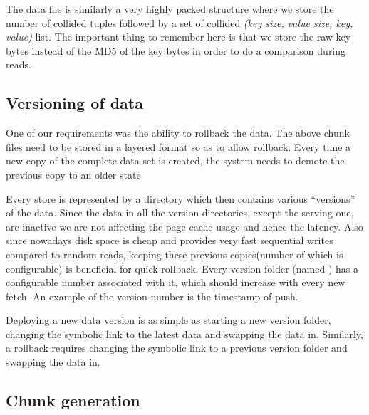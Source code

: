 The data file is similarly a very highly packed structure where we
store the number of collided tuples followed by a set of collided
\emph{(key size, value size, key, value)} list. The important thing to
remember here is that we store the raw key bytes instead of the MD5 of the
key bytes in order to do a comparison during reads. 


\subsection{Versioning of data}
\label{sec:read_only:versioning}

One of our requirements was the ability to rollback the data. The
above chunk files need to be stored in a layered format so as to allow
rollback. Every time a new copy of the complete data-set is created,
the system needs to demote the previous copy to an older state.

Every store is represented by a directory which then contains various
``versions'' of the data. Since the data in all the version
directories, except the serving one, are inactive we are not affecting
the page cache usage and hence the latency. Also since nowadays disk
space is cheap and provides very fast sequential writes compared to
random reads, keeping these previous copies(number of which is
configurable) is beneficial for quick rollback. Every version folder
(named ) has a configurable number associated
with it, which should increase with every new fetch. An example of the
version number is the timestamp of push. 

Deploying a new data version is as simple as starting a new version
folder, changing the symbolic link to the latest data and swapping the
data in. Similarly, a rollback requires changing the symbolic link to a 
previous version folder and swapping the data in. 


\subsection{Chunk generation}
\label{sec:read_only:chunk_generation}

